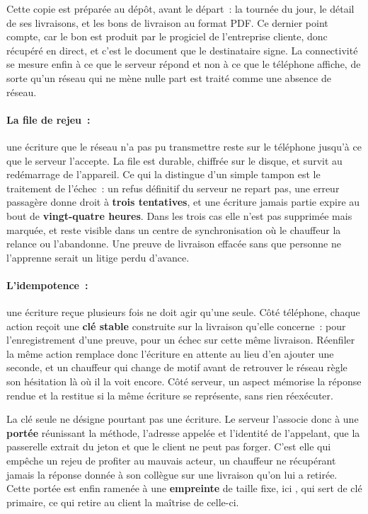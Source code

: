 Cette copie est préparée au dépôt, avant le départ~: la tournée du jour, le détail de ses livraisons,
et les bons de livraison au format PDF. Ce dernier point compte, car le bon est produit par le
progiciel de l'entreprise cliente, donc récupéré en direct, et c'est le document que le destinataire
signe. La connectivité se mesure enfin à ce que le serveur répond et non à ce que le téléphone
affiche, de sorte qu'un réseau qui ne mène nulle part est traité comme une absence de réseau.

\paragraph{La file de rejeu~:} une écriture que le réseau n'a pas pu transmettre reste sur le
téléphone jusqu'à ce que le serveur l'accepte. La file est durable, chiffrée sur le disque, et
survit au redémarrage de l'appareil. Ce qui la distingue d'un simple tampon est le traitement de
l'échec~: un refus définitif du serveur ne repart pas, une erreur passagère donne droit à
\textbf{trois tentatives}, et une écriture jamais partie expire au bout de \textbf{vingt-quatre
heures}. Dans les trois cas elle n'est pas supprimée mais marquée, et reste visible dans un centre de
synchronisation où le chauffeur la relance ou l'abandonne. Une preuve de livraison effacée sans que
personne ne l'apprenne serait un litige perdu d'avance.

\paragraph{L'idempotence~:} une écriture reçue plusieurs fois ne doit agir qu'une seule. Côté
téléphone, chaque action reçoit une \textbf{clé stable} construite sur la livraison qu'elle
concerne~:  pour l'enregistrement d'une preuve,  pour un
échec sur cette même livraison. Réenfiler la même action remplace donc l'écriture en attente au lieu
d'en ajouter une seconde, et un chauffeur qui change de motif avant de retrouver le réseau règle son
hésitation là où il la voit encore. Côté serveur, un aspect mémorise la réponse rendue et la restitue
si la même écriture se représente, sans rien réexécuter.

La clé seule ne désigne pourtant pas une écriture. Le serveur l'associe donc à une \textbf{portée}
réunissant la méthode, l'adresse appelée et l'identité de l'appelant, que la passerelle extrait du
jeton et que le client ne peut pas forger. C'est elle qui empêche un rejeu de profiter au mauvais
acteur, un chauffeur ne récupérant jamais la réponse donnée à son collègue sur une livraison qu'on
lui a retirée. Cette portée est enfin ramenée à une \textbf{empreinte} de taille fixe, ici
, qui sert de clé primaire, ce qui retire au client la maîtrise de celle-ci.

